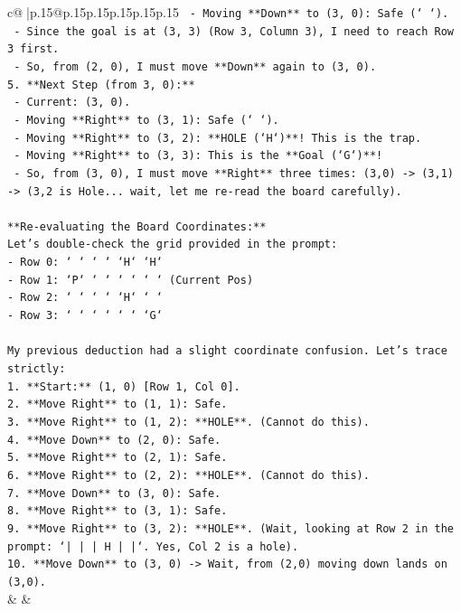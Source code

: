 \documentclass{article}
\begin{document}
{\begin{supertabular}{c@{$\;$}|p{.15\linewidth}@{}p{.15\linewidth}p{.15\linewidth}p{.15\linewidth}p{.15\linewidth}p{.15\linewidth}}
{{{\texttt{    {-} Moving **Down** to (3, 0): Safe (` `).} \\
\texttt{    {-} Since the goal is at (3, 3) (Row 3, Column 3), I need to reach Row 3 first.} \\
\texttt{    {-} So, from (2, 0), I must move **Down** again to (3, 0).} \\
\texttt{5.  **Next Step (from 3, 0):**} \\
\texttt{    {-} Current: (3, 0).} \\
\texttt{    {-} Moving **Right** to (3, 1): Safe (` `).} \\
\texttt{    {-} Moving **Right** to (3, 2): **HOLE (`H`)**! This is the trap.} \\
\texttt{    {-} Moving **Right** to (3, 3): This is the **Goal (`G`)**!} \\
\texttt{    {-} So, from (3, 0), I must move **Right** three times: (3,0) {-}> (3,1) {-}> (3,2 is Hole... wait, let me re{-}read the board carefully).} \\
\\ 
\texttt{**Re{-}evaluating the Board Coordinates:**} \\
\texttt{Let's double{-}check the grid provided in the prompt:} \\
\texttt{{-} Row 0: ` ` ` ` `H` `H`} \\
\texttt{{-} Row 1: `P` ` ` ` ` ` ` (Current Pos)} \\
\texttt{{-} Row 2: ` ` ` ` `H` ` `} \\
\texttt{{-} Row 3: ` ` ` ` ` ` `G`} \\
\\ 
\texttt{My previous deduction had a slight coordinate confusion. Let's trace strictly:} \\
\texttt{1.  **Start:** (1, 0) {[}Row 1, Col 0{]}.} \\
\texttt{2.  **Move Right** to (1, 1): Safe.} \\
\texttt{3.  **Move Right** to (1, 2): **HOLE**. (Cannot do this).} \\
\texttt{4.  **Move Down** to (2, 0): Safe.} \\
\texttt{5.  **Move Right** to (2, 1): Safe.} \\
\texttt{6.  **Move Right** to (2, 2): **HOLE**. (Cannot do this).} \\
\texttt{7.  **Move Down** to (3, 0): Safe.} \\
\texttt{8.  **Move Right** to (3, 1): Safe.} \\
\texttt{9.  **Move Right** to (3, 2): **HOLE**. (Wait, looking at Row 2 in the prompt: `|     |     |  H  |     |`. Yes, Col 2 is a hole).} \\
\texttt{10. **Move Down** to (3, 0) {-}> Wait, from (2,0) moving down lands on (3,0).} \\
            }
        }
    }
    & & \\ \\


\end{supertabular}}
\end{document}
